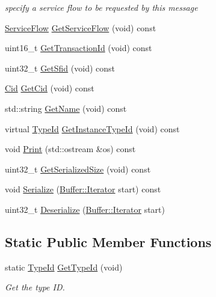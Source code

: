 \begin{DoxyCompactItemize}
\begin{DoxyCompactList}\small\item\em specify a service flow to be requested by this message \end{DoxyCompactList}\item 
\hyperlink{classns3_1_1ServiceFlow}{Service\+Flow} \hyperlink{classns3_1_1DsaReq_aaa23ab24bba50ef22b5d74c58bc12a5d}{Get\+Service\+Flow} (void) const 
\item 
uint16\+\_\+t \hyperlink{classns3_1_1DsaReq_adfb9899dd1d750e8e287d14e9c41fd62}{Get\+Transaction\+Id} (void) const 
\item 
uint32\+\_\+t \hyperlink{classns3_1_1DsaReq_ae2254e19e17865eceac8bb7a54458fea}{Get\+Sfid} (void) const 
\item 
\hyperlink{classns3_1_1Cid}{Cid} \hyperlink{classns3_1_1DsaReq_af7feeeb9568240d02afe5a0872b9bae4}{Get\+Cid} (void) const 
\item 
std\+::string \hyperlink{classns3_1_1DsaReq_a14f81f1b6e80b552185e6311dc19e606}{Get\+Name} (void) const 
\item 
virtual \hyperlink{classns3_1_1TypeId}{Type\+Id} \hyperlink{classns3_1_1DsaReq_a2d47b1b07eece30d9d162005b787465d}{Get\+Instance\+Type\+Id} (void) const 
\item 
void \hyperlink{classns3_1_1DsaReq_aa3d3f0f9ed8d22f99cf4c306cdfe8c79}{Print} (std\+::ostream \&os) const 
\item 
uint32\+\_\+t \hyperlink{classns3_1_1DsaReq_ae960f34279f0d96545cea08e9566fa54}{Get\+Serialized\+Size} (void) const 
\item 
void \hyperlink{classns3_1_1DsaReq_a5e5bbf11205cc44764d145d44d240c50}{Serialize} (\hyperlink{classns3_1_1Buffer_1_1Iterator}{Buffer\+::\+Iterator} start) const 
\item 
uint32\+\_\+t \hyperlink{classns3_1_1DsaReq_ac18b85e52155990af188369c18a162b5}{Deserialize} (\hyperlink{classns3_1_1Buffer_1_1Iterator}{Buffer\+::\+Iterator} start)
\end{DoxyCompactItemize}
\subsection*{Static Public Member Functions}
\begin{DoxyCompactItemize}
\item 
static \hyperlink{classns3_1_1TypeId}{Type\+Id} \hyperlink{classns3_1_1DsaReq_a4e595a5ba695455eef57461aadbb49af}{Get\+Type\+Id} (void)
\begin{DoxyCompactList}\small\item\em Get the type ID. \end{DoxyCompactList}\end{DoxyCompactItemize}
